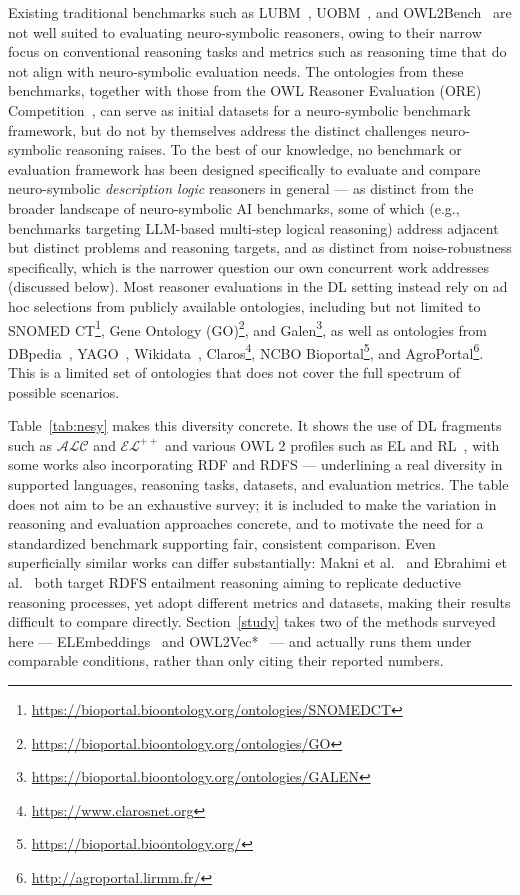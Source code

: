 Existing traditional benchmarks such as LUBM~\cite{LUBM}, UOBM~\cite{UOBM}, and OWL2Bench~\cite{owl2bench} are not well suited to evaluating neuro-symbolic reasoners, owing to their narrow focus on conventional reasoning tasks and metrics such as reasoning time that do not align with neuro-symbolic evaluation needs. The ontologies from these benchmarks, together with those from the OWL Reasoner Evaluation (ORE) Competition~\cite{ORE}, can serve as initial datasets for a neuro-symbolic benchmark framework, but do not by themselves address the distinct challenges neuro-symbolic reasoning raises. To the best of our knowledge, no benchmark or evaluation framework has been designed specifically to evaluate and compare neuro-symbolic \emph{description logic} reasoners in general — as distinct from the broader landscape of neuro-symbolic AI benchmarks, some of which (e.g., benchmarks targeting LLM-based multi-step logical reasoning) address adjacent but distinct problems and reasoning targets, and as distinct from noise-robustness specifically, which is the narrower question our own concurrent work addresses (discussed below). Most reasoner evaluations in the DL setting instead rely on ad hoc selections from publicly available ontologies, including but not limited to SNOMED CT\footnote{\url{https://bioportal.bioontology.org/ontologies/SNOMEDCT}}, Gene Ontology (GO)\footnote{\url{https://bioportal.bioontology.org/ontologies/GO}}, and Galen\footnote{\url{https://bioportal.bioontology.org/ontologies/GALEN}}, as well as ontologies from DBpedia~\cite{dbpedia}, YAGO~\cite{yago}, Wikidata~\cite{wikidata}, Claros\footnote{\url{https://www.clarosnet.org}}, NCBO Bioportal\footnote{\url{https://bioportal.bioontology.org/}}, and AgroPortal\footnote{\url{http://agroportal.lirmm.fr/}}. This is a limited set of ontologies that does not cover the full spectrum of possible scenarios.

Table~\ref{tab:nesy} makes this diversity concrete. It shows the use of DL fragments such as $\mathcal{ALC}$ and $\mathcal{EL}^{++}$ and various OWL 2 profiles such as EL and RL~\cite{OWL2profile}, with some works also incorporating RDF and RDFS — underlining a real diversity in supported languages, reasoning tasks, datasets, and evaluation metrics. The table does not aim to be an exhaustive survey; it is included to make the variation in reasoning and evaluation approaches concrete, and to motivate the need for a standardized benchmark supporting fair, consistent comparison. Even superficially similar works can differ substantially: Makni et al.~\cite{noise-tolerant} and Ebrahimi et al.~\cite{pointer_nw} both target RDFS entailment reasoning aiming to replicate deductive reasoning processes, yet adopt different metrics and datasets, making their results difficult to compare directly. Section~\ref{study} takes two of the methods surveyed here — ELEmbeddings~\cite{ELEm} and OWL2Vec*~\cite{owl2vecstar} — and actually runs them under comparable conditions, rather than only citing their reported numbers.

